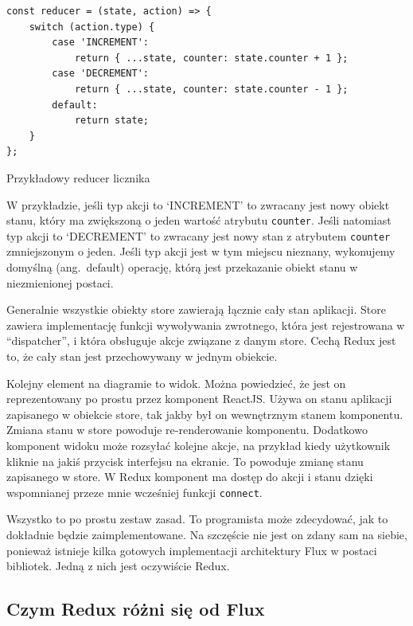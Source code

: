 \begin{listing}
\begin{verbatim}
const reducer = (state, action) => {
    switch (action.type) {
        case 'INCREMENT':
            return { ...state, counter: state.counter + 1 };
        case 'DECREMENT':
            return { ...state, counter: state.counter - 1 };
        default:
            return state;
    }
};
\end{verbatim}
\caption{Przykładowy reducer licznika} \label{listing:reducer}
\end{listing}

W przykładzie, jeśli typ akcji to `INCREMENT' to zwracany jest nowy obiekt stanu,
który ma zwiększoną o jeden wartość atrybutu \texttt{counter}.
Jeśli natomiast typ akcji to `DECREMENT' to zwracany jest nowy stan z atrybutem
\texttt{counter} zmniejszonym o jeden.
Jeśli typ akcji jest w tym miejscu nieznany, wykonujemy domyślną (ang.\ default) operację, którą jest
przekazanie obiekt stanu w niezmienionej postaci.

Generalnie wszystkie obiekty store zawierają łącznie cały stan aplikacji.
Store zawiera implementację funkcji wywoływania zwrotnego,
która jest rejestrowana w ``dispatcher'', i która obsługuje akcje związane z danym store.
Cechą Redux jest to, że cały stan jest przechowywany w jednym obiekcie.

Kolejny element na diagramie to widok.
Można powiedzieć, że jest on reprezentowany po prostu przez komponent ReactJS\@.
Używa on stanu aplikacji zapisanego w obiekcie store, tak jakby był on wewnętrznym stanem komponentu.
Zmiana stanu w store powoduje re-renderowanie komponentu.
Dodatkowo komponent widoku może rozsyłać kolejne akcje, na przykład kiedy użytkownik
kliknie na jakiś przycisk interfejsu na ekranie.
To powoduje zmianę stanu zapisanego w store.
W Redux komponent ma dostęp do akcji i stanu dzięki wspomnianej przeze mnie wcześniej funkcji \texttt{connect}.

Wszystko to po prostu zestaw zasad.
To programista może zdecydować, jak to dokładnie będzie zaimplementowane.
Na szczęście nie jest on zdany sam na siebie, ponieważ istnieje kilka gotowych
implementacji architektury Flux w postaci bibliotek.
Jedną z nich jest oczywiście Redux.
~\cite{www_nafrontendzie}

\subsection{Czym Redux różni się od Flux}

